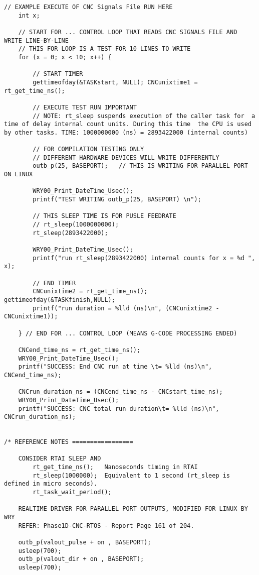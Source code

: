 \begin{lstlisting}[caption={App4-Full C-Code listing for Real Time (RTAI)}, label=App4-Full C-Code listing for Real Time (RTAI)]
	// EXAMPLE EXECUTE OF CNC Signals File RUN HERE 
	int x; 
	
	// START FOR ... CONTROL LOOP THAT READS CNC SIGNALS FILE AND WRITE LINE-BY-LINE
	// THIS FOR LOOP IS A TEST FOR 10 LINES TO WRITE
	for (x = 0; x < 10; x++) {
		
		// START TIMER
		gettimeofday(&TASKstart, NULL); CNCunixtime1 = rt_get_time_ns();
		
		// EXECUTE TEST RUN IMPORTANT
		// NOTE: rt_sleep suspends execution of the caller task for  a time of delay internal count units. During this time  the CPU is used by other tasks. TIME: 1000000000 (ns) = 2893422000 (internal counts)

		// FOR COMPILATION TESTING ONLY
		// DIFFERENT HARDWARE DEVICES WILL WRITE DIFFERENTLY
		outb_p(25, BASEPORT);   // THIS IS WRITING FOR PARALLEL PORT ON LINUX

		WRY00_Print_DateTime_Usec(); 
		printf("TEST WRITING outb_p(25, BASEPORT) \n");

		// THIS SLEEP TIME IS FOR PUSLE FEEDRATE
		// rt_sleep(1000000000);
		rt_sleep(2893422000);

		WRY00_Print_DateTime_Usec(); 
		printf("run rt_sleep(2893422000) internal counts for x = %d ", x);

		// END TIMER
		CNCunixtime2 = rt_get_time_ns(); gettimeofday(&TASKfinish,NULL);
		printf("run duration = %lld (ns)\n", (CNCunixtime2 - CNCunixtime1));
		
	} // END FOR ... CONTROL LOOP (MEANS G-CODE PROCESSING ENDED)

	CNCend_time_ns = rt_get_time_ns();
	WRY00_Print_DateTime_Usec(); 
	printf("SUCCESS: End CNC run at time \t= %lld (ns)\n", CNCend_time_ns);
	
	CNCrun_duration_ns = (CNCend_time_ns - CNCstart_time_ns);
	WRY00_Print_DateTime_Usec(); 
	printf("SUCCESS: CNC total run duration\t= %lld (ns)\n", CNCrun_duration_ns);


/* REFERENCE NOTES ================= 

	CONSIDER RTAI SLEEP AND 
		rt_get_time_ns();   Nanoseconds timing in RTAI
		rt_sleep(1000000);  Equivalent to 1 second (rt_sleep is defined in micro seconds).
		rt_task_wait_period();
	
	REALTIME DRIVER FOR PARALLEL PORT OUTPUTS, MODIFIED FOR LINUX BY WRY
	REFER: Phase1D-CNC-RTOS - Report Page 161 of 204.
	
	outb_p(valout_pulse + on , BASEPORT);
	usleep(700);
	outb_p(valout_dir + on , BASEPORT);
	usleep(700);
	

\end{lstlisting}
